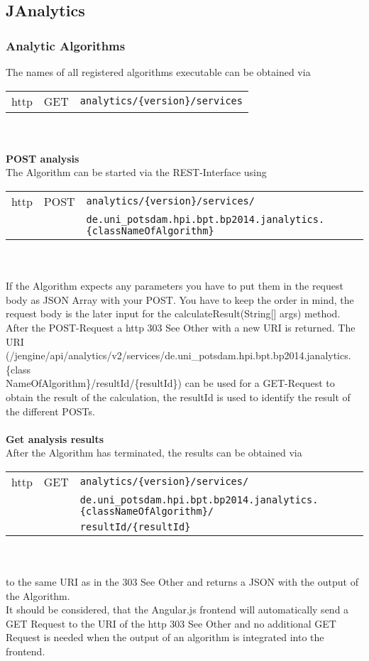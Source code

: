 %
\subsection{JAnalytics} %
\label{subsec:JAnalytics}

	\subsubsection{Analytic Algorithms}
	
	The names of all registered algorithms executable can be obtained via\\
			\begin{tabular}{lll}
				http & GET & \texttt{analytics/\{version\}/services}
			\end{tabular}\\
			\\
	\textbf{POST analysis}\\
	The Algorithm can be started via the REST-Interface using\\
			\begin{tabular}{lll}
				http & POST & \texttt{analytics/\{version\}/services/}\\
				& & \texttt{de.uni\_potsdam.hpi.bpt.bp2014.janalytics.\{classNameOfAlgorithm\}}
			\end{tabular}
			\\
			\\
If the Algorithm expects any parameters you have to put them in the request body as JSON Array with your POST. You have to keep the order in mind, the request body is the later input for the calculateResult(String[] args) method. \\
After the POST-Request a http 303 See Other with a new URI is returned. The URI (/jengine/api/analytics/v2/services/de.uni\_potsdam.hpi.bpt.bp2014.janalytics.\{class\\NameOfAlgorithm\}/resultId/\{resultId\}) can be used for a GET-Request to obtain the result of the calculation, the resultId is used to identify the result of the different POSTs.\\
\\
	\textbf{Get analysis results}\\
	After the Algorithm has terminated, the results can be obtained via 
	\\
			\begin{tabular}{lll}
				http & GET & \texttt{analytics/\{version\}/services/}\\
				& & \texttt{de.uni\_potsdam.hpi.bpt.bp2014.janalytics.\{classNameOfAlgorithm\}/}\\
				& & \texttt{resultId/\{resultId\}}
			\end{tabular}
			\\
			\\
			to the same URI as in the 303 See Other and returns a JSON with the output of the Algorithm.\\
It should be considered, that the Angular.js frontend will automatically send a GET Request to the URI of the http 303 See Other and no additional GET Request is needed when the output of an algorithm is integrated into the frontend.

